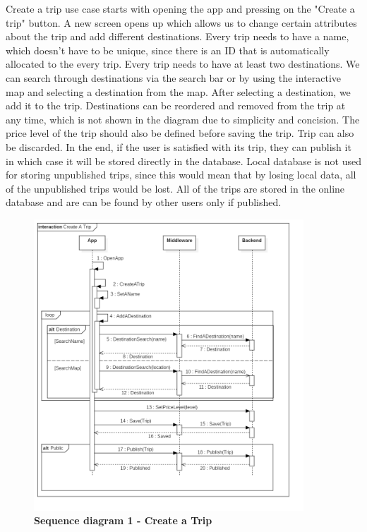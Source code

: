 \hspace{\parindent}Create a trip use case starts with opening the app and pressing on the "Create a trip" button. A new screen opens up which allows us to change certain attributes about the trip and add different destinations. Every trip needs to have a name, which doesn't have to be unique, since there is an ID that is automatically allocated to the every trip. Every trip needs to have at least two destinations. We can search through destinations via the search bar or by using the interactive map and selecting a destination from the map. After selecting a destination, we add it to the trip. Destinations can be reordered and removed from the trip at any time, which is not shown in the diagram due to simplicity and concision. The price level of the trip should also be defined before saving the trip. Trip can also be discarded. In the end, if the user is satisfied with its trip, they can publish it in which case it will be stored directly in the database. Local database is not used for storing unpublished trips, since this would mean that by losing local data, all of the unpublished trips would be lost. All of the trips are stored in the online database and are can be found by other users only if published.  
\begin{figure}[!htb]
\centering
\includegraphics[width=0.9\textwidth]{../Graphs/Sequence1_Create_A_Trip.png}
\caption{\label{fig:dbapiuser}\textbf{Sequence diagram 1 - Create a Trip}}
\end{figure}
\newpage
